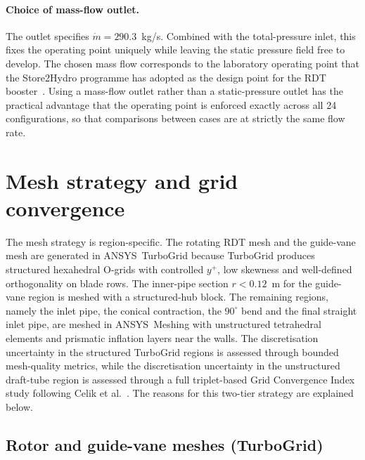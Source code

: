 \paragraph{Choice of mass-flow outlet.}
The outlet specifies $\dot m = 290.3$~kg/s. Combined with the total-pressure inlet, this fixes the operating point uniquely while leaving the static pressure field free to develop. The chosen mass flow corresponds to the laboratory operating point that the Store2Hydro programme has adopted as the design point for the RDT booster~\cite{Verdijck2025, Fjuk2025}. Using a mass-flow outlet rather than a static-pressure outlet has the practical advantage that the operating point is enforced exactly across all 24 configurations, so that comparisons between cases are at strictly the same flow rate.
 
\section{Mesh strategy and grid convergence}
\label{sec:methods_mesh}

The mesh strategy is region-specific. The rotating RDT mesh and the guide-vane mesh are generated in ANSYS~TurboGrid because TurboGrid produces structured hexahedral O-grids with controlled $y^+$, low skewness and well-defined orthogonality on blade rows. The inner-pipe section $r < 0.12$~m for the guide-vane region is meshed with a structured-hub block. The remaining regions, namely the inlet pipe, the conical contraction, the $90^\circ$ bend and the final straight inlet pipe, are meshed in ANSYS~Meshing with unstructured tetrahedral elements and prismatic inflation layers near the walls. The discretisation uncertainty in the structured TurboGrid regions is assessed through bounded mesh-quality metrics, while the discretisation uncertainty in the unstructured draft-tube region is assessed through a full triplet-based Grid Convergence Index study following Celik et al.~\cite{Celik2008}. The reasons for this two-tier strategy are explained below.

\subsection{Rotor and guide-vane meshes (TurboGrid)}
\label{sec:turbogrid_quality}

